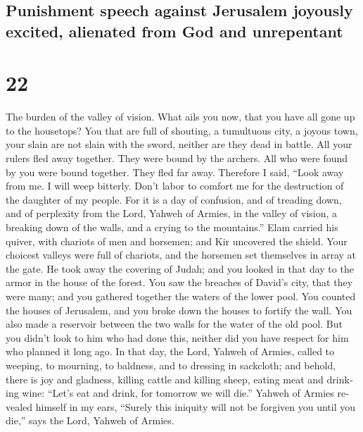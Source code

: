 \begin{paracol}{2}
\begin{otherlanguage}{english}
\hypertarget{punishment-speech-against-jerusalem-joyously-excited-alienated-from-god-and-unrepentant}{%
\subsection{Punishment speech against Jerusalem joyously excited,
alienated from God and
unrepentant}\label{punishment-speech-against-jerusalem-joyously-excited-alienated-from-god-and-unrepentant}}

\hypertarget{section-43}{%
\section{22}\label{section-43}}

 The burden of the valley of vision. What ails you now,
that you have all gone up to the housetops?  You that are
full of shouting, a tumultuous city, a joyous town, your slain are not
slain with the sword, neither are they dead in battle. 
All your rulers fled away together. They were bound by the archers. All
who were found by you were bound together. They fled far away.
 Therefore I said, ``Look away from me. I will weep
bitterly. Don't labor to comfort me for the destruction of the daughter
of my people.  For it is a day of confusion, and of
treading down, and of perplexity from the Lord, Yahweh of Armies, in the
valley of vision, a breaking down of the walls, and a crying to the
mountains.''  Elam carried his quiver, with chariots of
men and horsemen; and Kir uncovered the shield.  Your
choicest valleys were full of chariots, and the horsemen set themselves
in array at the gate.  He took away the covering of Judah;
and you looked in that day to the armor in the house of the forest.
 You saw the breaches of David's city, that they were
many; and you gathered together the waters of the lower pool.
 You counted the houses of Jerusalem, and you broke down
the houses to fortify the wall.  You also made a
reservoir between the two walls for the water of the old pool. But you
didn't look to him who had done this, neither did you have respect for
him who planned it long ago.  In that day, the Lord,
Yahweh of Armies, called to weeping, to mourning, to baldness, and to
dressing in sackcloth;  and behold, there is joy and
gladness, killing cattle and killing sheep, eating meat and drinking
wine: ``Let's eat and drink, for tomorrow we will die.'' 
Yahweh of Armies revealed himself in my ears, ``Surely this iniquity
will not be forgiven you until you die,'' says the Lord, Yahweh of
Armies.


\end{otherlanguage}
\end{paracol}
